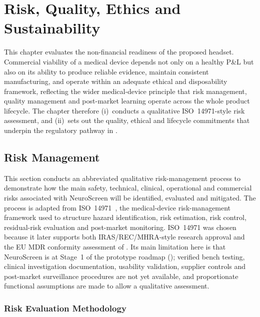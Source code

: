 \chapter{Risk, Quality, Ethics and Sustainability}
\label{chapter:ent-risk}


This chapter evaluates the non-financial readiness of the proposed headset. Commercial viability of a medical device depends not only on a healthy P\&L but also on its ability to produce reliable evidence, maintain consistent manufacturing, and operate within an adequate ethical and disposability framework, reflecting the wider medical-device principle that risk management, quality management and post-market learning operate across the whole product lifecycle. The chapter therefore (i)~conducts a qualitative ISO~14971-style risk assessment, and (ii)~sets out the quality, ethical and lifecycle commitments that underpin the regulatory pathway in .


\section{Risk Management}
\label{sec:ent-risk-mgmt}

This section conducts an abbreviated qualitative risk-management process to demonstrate how the main safety, technical, clinical, operational and commercial risks associated with NeuroScreen will be identified, evaluated and mitigated. The process is adapted from ISO~14971~\cite{iso14971}, the medical-device risk-management framework used to structure hazard identification, risk estimation, risk control, residual-risk evaluation and post-market monitoring. ISO~14971 was chosen because it later supports both IRAS/REC/MHRA-style research approval and the EU MDR conformity assessment of . Its main limitation here is that NeuroScreen is at Stage~1 of the prototype roadmap (); verified bench testing, clinical investigation documentation, usability validation, supplier controls and post-market surveillance procedures are not yet available, and proportionate functional assumptions are made to allow a qualitative assessment.

\subsection{Risk Evaluation Methodology}

